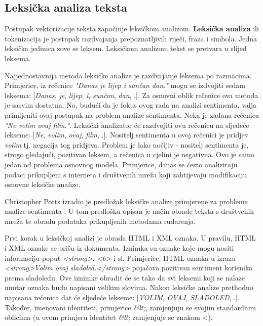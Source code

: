\documentclass[times, utf8, zavrsni, numeric]{fer}
\begin{document}
\subsection{Leksička analiza teksta}
Postupak vektorizacije teksta započinje leksičkom analizom.
\textbf{Leksička analiza} ili tokenizacija je postupak razdvajanja prepoznatljivih riječi, fraza i simbola.
Jedna leksička jedinica zove se leksem. Leksičkom analizom tekst se pretvara u slijed leksema.

\par Najjednostavnija metoda leksičke analize je razdvajanje leksema po razmacima. 
Primjerice, iz rečenice \textit{"Danas je lijep i sunčan dan."} mogu se izdvojiti sedam leksema:
[\textit{Danas}, \textit{je}, \textit{lijep}, \textit{i}, \textit{sunčan}, \textit{dan}, .].
Za osnovni oblik rečenice ova metoda je sasvim dostatna.
No, budući da je fokus ovog rada na analizi sentimenta, valja primijeniti ovaj postupak na problem analize
sentimenta. Neka je zadana rečenica \textit{"Ne volim ovaj film."}. 
Leksički analizator će razdvojiti ovu rečenicu na sljedeće lekseme: [\textit{Ne}, \textit{volim}, 
\textit{ovaj}, \textit{film}, .].
Nositelj sentimenta u ovoj rečenici je pridjev \textit{volim} tj. negacija tog pridjeva.
Problem je lako uočljiv - nositelj sentimenta je, strogo gledajući, pozitivan leksem, a rečenica u cjelini
je negativna. 
Ovo je samo jedan od problema osnovnog modela.
Primjerice, danas se često analiziraju podaci prikupljeni s interneta i društvenih mreža koji zahtijevaju
modifikaciju osnovne leksičke analize. 

\par Christopher Potts izradio je predložak leksičke analize primjerene za probleme analize sentimenta
\cite{SATok}.
U tom predlošku opisan je način obrade teksta s društvenih mreža te obradu podataka prikupljenih metodama
rudarenja.

\par Prvi korak u leksičkoj analizi je obrada HTML i XML oznaka.
U pravilu, HTML i XML oznake se brišu iz dokumenta.
Iznimka su oznake koje mogu nositi informaciju poput \textit{<strong>}, \textit{<b>} i sl.
Primjerice, HTML oznaka u izrazu \textit{<strong>Volim ovaj sladoled.</strong>} pojačava pozitivan
sentiment korisnika prema sladoledu.
Ove iznimke obradit će se tako da svi leksemi koji se nalaze unutar oznaka budu napisani velikim slovima.
Nakon leksičke analize prethodno napisana rečenica dat će sljedeće lekseme: 
[\textit{VOLIM}, \textit{OVAJ}, \textit{SLADOLED}, .].
Također, imenovani identiteti, primjerice \textit{\&lt;}, zamjenjuju se svojim standardnim oblicima
(u ovom primjeru identitet \textit{\&lt;} zamjenjuje se znakom <).
\end{document}
